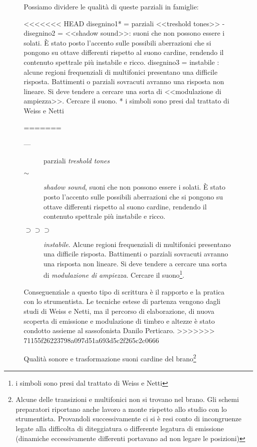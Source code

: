 \begin{figure}
Possiamo dividere le qualità di queste parziali in famiglie:

<<<<<<< HEAD
disegnino1* = parziali <<treshold tones>>  -
disegnino2 = <<shadow sound>>: suoni che non possono essere i solati.
È stato posto l’accento sulle possibili aberrazioni che si pongono su ottave differenti
rispetto al suono cardine, rendendo il contenuto spettrale più instabile e ricco.
disegnino3 = instabile : alcune regioni frequenziali di multifonici presentano una
difficile risposta. Battimenti o parziali sovracuti avranno una risposta non lineare.
Si deve tendere a cercare una sorta di <<modulazione di ampiezza>>. Cercare il suono.
* i simboli sono presi dal trattato di Weiss e Netti

=======
\begin{description}
	\item[ --- ] parziali \emph{treshold tones}
	\item[ $ \sim $]  \emph{shadow sound}, suoni che non possono essere i solati.
	È stato posto l’accento sulle possibili aberrazioni che si pongono su ottave differenti
	rispetto al suono cardine, rendendo il contenuto spettrale più instabile e ricco.
	\item [ $ \supset\supset\supset $] \emph{instabile}. Alcune regioni frequenziali di multifonici presentano una
	difficile risposta. Battimenti o parziali sovracuti avranno una risposta non lineare.
	Si deve tendere a cercare una sorta di \emph{modulazione di ampiezza}.
	Cercare il suono\footnote{i simboli sono presi dal trattato di Weiss e Netti}.
\end{description}

Conseguenziale a questo tipo di scrittura è il rapporto e la pratica con lo strumentista.
Le tecniche estese di partenza vengono dagli studi di Weiss e Netti, ma il percorso di
elaborazione, di nuova scoperta di emissione e modulazione di timbro e altezze è
stato condotto assieme al sassofonista Danilo Perticaro.
>>>>>>> 71155f26223798a097d51a693d5c2f265c2c0666

Qualità sonore e trasformazione suoni cardine del brano\footnote{Alcune delle transizioni
e multifonici non si trovano nel brano. Gli schemi preparatori riportano anche lavoro a
monte rispetto allo studio con lo strumentista. Provandoli successivamente ci si è resi conto
di incongruenze legate alla difficolta di diteggiatura o differente
legatura di emissione (dinamiche eccessivamente differenti portavano ad non legare le posizioni)}

\clearpage


\end{figure}
